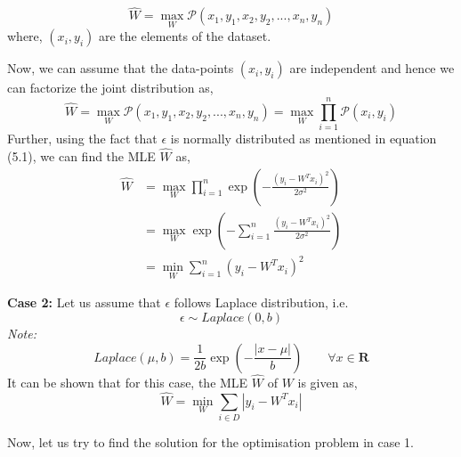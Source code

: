 \documentclass[11pt]{article}
\begin{document}
\begin{equation*}
    \hat{W} = \max_{W} \mathcal{P} (x_1, y_1, x_2, y_2, ... , x_n, y_n) 
\end{equation*}
where, $(x_i, y_i)$ are the elements of the dataset.

Now, we can assume that the data-points $(x_i, y_i)$ are independent and hence we can factorize the joint distribution as,
\begin{equation*}
    \hat{W} = \max_{W} \mathcal{P} (x_1, y_1, x_2, y_2, ... , x_n, y_n) = \max_{W} \prod_{i = 1}^{n} \mathcal{P} (x_i, y_i)
\end{equation*}
Further, using the fact that $\epsilon$ is normally distributed as mentioned in equation (5.1), we can find the MLE $\hat{W}$ as,
\begin{align*}
        \hat{W} &= \max_{W} \prod_{i = 1}^{n} \exp ({- \frac{(y_i - W^T x_i)^2}{2\sigma^2}}) \\
        &= \max_W \exp(-\sum_{i = 1}^{n} {\frac{(y_i - W^T x_i)^2}{2\sigma^2}}) \\
        &= \min_{W} \sum_{i = 1}^{n} (y_i - W^T x_i)^2
\end{align*}

\textbf{Case 2:} Let us assume that $\epsilon$ follows Laplace distribution, i.e.
\begin{equation}
    \epsilon \sim Laplace(0 , b)
\end{equation}
\textit{Note:} 
\begin{equation*}
    Laplace (\mu, b) = \frac{1}{2b} \exp(- \frac{|x - \mu|}{b}) \quad \quad \forall x \in \mathbf{R} 
\end{equation*}
It can be shown that for this case, the MLE $\hat{W}$ of $W$ is given as,
\begin{equation*}
    \hat{W} = \min_W \sum_{i \in D} |y_i - W^T x_i|
\end{equation*}

Now, let us try to find the solution for the optimisation problem in case 1.
\end{document}
